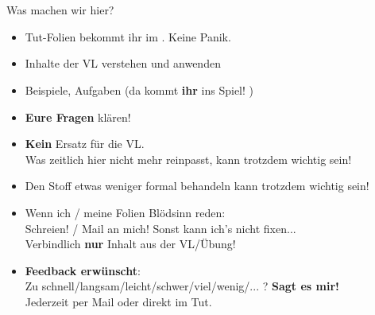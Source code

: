 






\section{}

\aboutMeFrame

\begin{frame}[t]{Was machen wir hier?}
	\begin{itemize}[<+->]
		\item Tut-Folien bekommt ihr im \ILIAS. Keine Panik.
		\item Inhalte der VL verstehen und anwenden
		\item Beispiele, Aufgaben (da kommt \textbf{ihr} ins Spiel! \smiley)
		\item \textbf{Eure Fragen} klären! 
		\item \textbf{Kein} Ersatz für die VL. \\
			  Was zeitlich hier nicht mehr reinpasst, kann trotzdem wichtig sein!
	    \item Den Stoff etwas weniger formal behandeln \impl {} kann trotzdem wichtig sein! 
	    \item Wenn ich / meine Folien Blödsinn reden: \\
		      Schreien! / Mail an mich! \impl Sonst kann ich's nicht fixen... \frownie \\
		      Verbindlich \textbf{nur} Inhalt aus der VL/Übung! 
		\item \textbf{Feedback erwünscht}: \\
			  Zu schnell/langsam/leicht/schwer/viel/wenig/... ? \impl \textbf{Sagt es mir!}\\
			  Jederzeit per Mail oder direkt im Tut.
	\end{itemize}
\end{frame}

